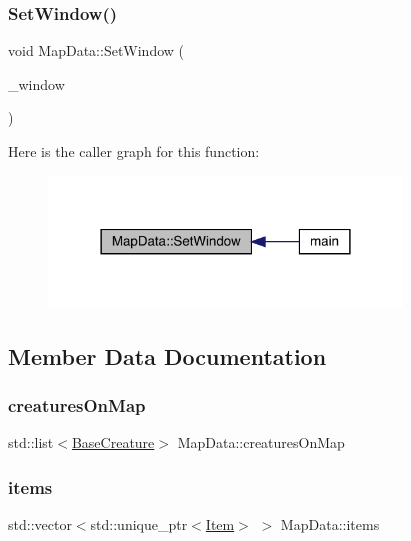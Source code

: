 \subsubsection{\texorpdfstring{Set\+Window()}{SetWindow()}}
{\footnotesize\ttfamily void Map\+Data\+::\+Set\+Window (\begin{DoxyParamCaption}\item[{sf\+::\+Render\+Window $\ast$}]{\+\_\+window }\end{DoxyParamCaption})}

Here is the caller graph for this function\+:
\nopagebreak
\begin{figure}[H]
\begin{center}
\leavevmode
\includegraphics[width=266pt]{de/d83/class_map_data_a2c65f950748fe264276e292f8a5b92f5_icgraph}
\end{center}
\end{figure}


\subsection{Member Data Documentation}
\mbox{\label{class_map_data_a9a096967eb9377ffb6c3afd937540319}} 
\subsubsection{\texorpdfstring{creatures\+On\+Map}{creaturesOnMap}}
{\footnotesize\ttfamily std\+::list$<$\mbox{\hyperlink{class_base_creature}{Base\+Creature}}$>$ Map\+Data\+::creatures\+On\+Map}

\mbox{\label{class_map_data_a21cf5ee5508940f91b56046186aa6dec}} 
\subsubsection{\texorpdfstring{items}{items}}
{\footnotesize\ttfamily std\+::vector$<$std\+::unique\+\_\+ptr$<$\mbox{\hyperlink{class_item}{Item}}$>$ $>$ Map\+Data\+::items}

